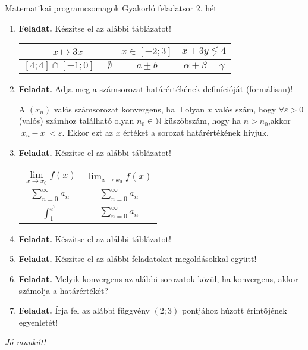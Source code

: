 \documentclass[12pt,a4paper]{article}
\begin{document}
\pagestyle{empty}
\noindent

Matematikai programcsomagok
Gyakorló feladatsor
2. hét

\begin{enumerate}
    \item \textbf{Feladat.} Készítse el az alábbi táblázatot! \par
    \begin{center}
        \begin{tabular}{|c|c|c|}
            \hline
            $x\mapsto 3x$ & 
            $ x \in \left[-2;3\right] $ & 
            $x+3y\lneqq 4$ \\
            \hline
            $\left[4;4\right] \cap \left[-1;0\right] = \emptyset$ & 
            $ a \pm b $ & 
            $\alpha+\beta=\gamma$\\
            \hline
        \end{tabular}
    \end{center}

    \item \textbf{Feladat.} Adja meg a számsorozat határértékének definícióját (formálisan)! \par
    A $(x_n)$ valós számsorozat konvergens, ha $\exists$ olyan $x$ valós szám, hogy $\forall\varepsilon > 0$ (valós)
    számhoz található olyan $n_0 \in \mathbb{N}$ küszöbszám, hogy ha $n>n_0$,akkor 
    $\left|x_n-x\right|<\varepsilon$. Ekkor
    ezt az $x$ értéket a sorozat határértékének hívjuk.

    \item \textbf{Feladat.} Készítse el az alábbi táblázatot! 
    \begin{center}
        \begin{tabular}{|c|c|}
            \hline
            $\lim\limits_{x \to x_0} f(x)$ &$\lim_{x \to x_0} f(x)$\\
            \hline
            $\sum\limits_{n=0}^\infty a_n$&$\sum_{n=0}^{\infty}a_n$\\
            \hline
            $\displaystyle\int_{1}^{e^2}$&$\sum_{n=0}^{\infty}a_n$\\
            \hline
        \end{tabular}
    \end{center}

    \item \textbf{Feladat.} Készítse el az alábbi táblázatot!

    \item \textbf{Feladat.} Készítse el az alábbi feladatokat megoldásokkal együtt!

          \vfill\eject
    \item \textbf{Feladat.} Melyik konvergens az alábbi sorozatok közül, ha konvergens, akkor számolja a határértékét?

    \item \textbf{Feladat.} Írja fel az alábbi függvény $(2;3)$ pontjához húzott érintõjének egyenletét! \par
\end{enumerate}

\vspace{0.2cm}
\begin{center}
    \textit{Jó munkát!}
\end{center}
\end{document}
